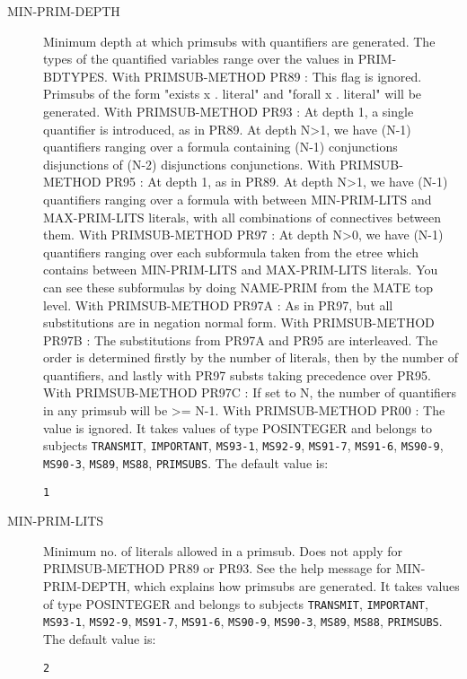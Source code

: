 \begin{description}
\item[MIN-PRIM-DEPTH]  
Minimum depth at which primsubs with quantifiers are generated.
The types of the quantified variables range over the values in PRIM-BDTYPES.
With PRIMSUB-METHOD PR89 : 
 This flag is ignored. Primsubs of the form "exists x . literal" and 
 "forall x . literal" will be generated.
With PRIMSUB-METHOD PR93 :
 At depth 1, a single quantifier is introduced, as in PR89. 
 At depth N>1, we have (N-1) quantifiers ranging over a formula
 containing (N-1) conjunctions {disjunctions} of (N-2) 
 disjunctions {conjunctions}.
With PRIMSUB-METHOD PR95 :
 At depth 1, as in PR89.
 At depth N>1, we have (N-1) quantifiers ranging over a formula
 with between MIN-PRIM-LITS and MAX-PRIM-LITS literals, with
 all combinations of connectives between them.
With PRIMSUB-METHOD PR97 :
 At depth N>0, we have (N-1) quantifiers ranging over each 
 subformula taken from the etree which contains between 
 MIN-PRIM-LITS and MAX-PRIM-LITS literals. You can see these
 subformulas by doing NAME-PRIM from the MATE top level.
With PRIMSUB-METHOD PR97A :
 As in PR97, but all substitutions are in negation normal form.
With PRIMSUB-METHOD PR97B :
 The substitutions from PR97A and PR95 are interleaved. The order
 is determined firstly by the number of literals, then by the number of
 quantifiers, and lastly with PR97 substs taking precedence over PR95.
With PRIMSUB-METHOD PR97C :
 If set to N, the number of quantifiers in any primsub will be >= N-1.
With PRIMSUB-METHOD PR00  :
 The value is ignored.
It takes values of type POSINTEGER and belongs to subjects \texttt{TRANSMIT}, \texttt{IMPORTANT}, \texttt{MS93-1}, \texttt{MS92-9}, \texttt{MS91-7}, \texttt{MS91-6}, \texttt{MS90-9}, \texttt{MS90-3}, \texttt{MS89}, \texttt{MS88}, \texttt{PRIMSUBS}.  The default value is: \begin{lstlisting}
1
\end{lstlisting}

\item[MIN-PRIM-LITS]  
Minimum no. of literals allowed in a primsub.
Does not apply for PRIMSUB-METHOD PR89 or PR93. 
See the help message for MIN-PRIM-DEPTH, which explains how primsubs
are generated.
It takes values of type POSINTEGER and belongs to subjects \texttt{TRANSMIT}, \texttt{IMPORTANT}, \texttt{MS93-1}, \texttt{MS92-9}, \texttt{MS91-7}, \texttt{MS91-6}, \texttt{MS90-9}, \texttt{MS90-3}, \texttt{MS89}, \texttt{MS88}, \texttt{PRIMSUBS}.  The default value is: \begin{lstlisting}
2
\end{lstlisting}


\end{description}
